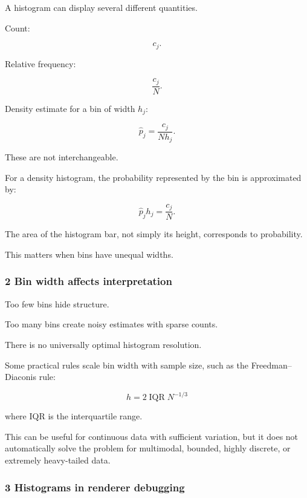 \hypertarget{02-foundations-ii-ch030-counts-frequencies-and-density}{}

A histogram can display several different quantities.

Count:

\[
 c_j.
\]

Relative frequency:

\[
 \frac{c_j}{N}.
\]

Density estimate for a bin of width \(h_j\):

\[
 \boxed{ \hat p_j= \frac{c_j}{Nh_j} }.
\]

These are not interchangeable.

For a density histogram, the probability represented by the bin is approximated by:

\[
 \hat p_jh_j=\frac{c_j}{N}.
\]

The area of the histogram bar, not simply its height, corresponds to probability.

This matters when bins have unequal widths.

\subsubsection{2 Bin width affects interpretation}\label{02-foundations-ii-ch030-bin-width-affects-interpretation}

\hypertarget{02-foundations-ii-ch030-bin-width-affects-interpretation}{}

Too few bins hide structure.

Too many bins create noisy estimates with sparse counts.

There is no universally optimal histogram resolution.

Some practical rules scale bin width with sample size, such as the Freedman--Diaconis rule:

\[
 \boxed{ h=2\operatorname{IQR}N^{-1/3} }
\]

where IQR is the interquartile range.

This can be useful for continuous data with sufficient variation, but it does not automatically solve the problem for multimodal, bounded, highly discrete, or extremely heavy-tailed data.

\subsubsection{3 Histograms in renderer debugging}\label{02-foundations-ii-ch030-histograms-in-renderer-debugging}

